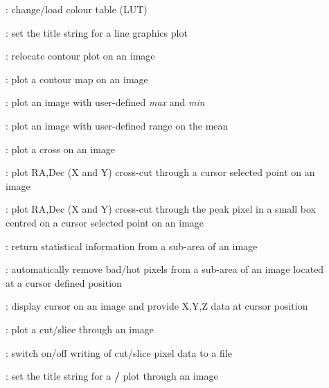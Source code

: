 \begin{description}
\begin{description}

\item []: change/load colour table (LUT)

\item []: set the title string for a
line graphics plot

\item []: relocate contour plot on an image

\item []: plot a contour map on an image

\item []: plot an image with user-defined {\it
max} and {\it min}

\item []: plot an image with user-defined
range on the mean

\item []: plot a cross on an image

\item []: plot RA,Dec (X and Y) cross-cut
through a cursor selected point on an image

\item []: plot RA,Dec (X and Y)
cross-cut through the peak pixel in a small box centred on a cursor
selected point on an image

\item []: return statistical information from a
sub-area of an image

\item []: automatically remove bad/hot pixels
from a sub-area of an image located at a cursor defined position

\item []: display cursor on an image and
provide X,Y,Z data at cursor position

\item []: plot a cut/slice through an image

\item []: switch on/off writing of cut/slice
pixel data to a file

\item []: set the title string for a
{\bf {}/} plot through an image


\end{description}
\end{description}
